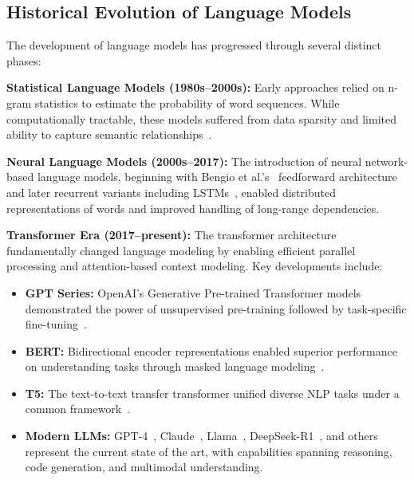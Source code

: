 \subsection{Historical Evolution of Language Models}

The development of language models has progressed through several distinct phases:

\textbf{Statistical Language Models (1980s--2000s):} Early approaches relied on n-gram statistics to estimate the probability of word sequences. While computationally tractable, these models suffered from data sparsity and limited ability to capture semantic relationships~\cite{manning1999foundations}.

\textbf{Neural Language Models (2000s--2017):} The introduction of neural network-based language models, beginning with Bengio et al.'s~\cite{bengio2003neural} feedforward architecture and later recurrent variants including LSTMs~\cite{hochreiter1997lstm}, enabled distributed representations of words and improved handling of long-range dependencies.

\textbf{Transformer Era (2017--present):} The transformer architecture~\cite{vaswani2017attention} fundamentally changed language modeling by enabling efficient parallel processing and attention-based context modeling. Key developments include:

\begin{itemize}[leftmargin=*]
    \item \textbf{GPT Series:} OpenAI's Generative Pre-trained Transformer models demonstrated the power of unsupervised pre-training followed by task-specific fine-tuning~\cite{radford2018gpt,radford2019gpt2,brown2020gpt3}.
    
    \item \textbf{BERT:} Bidirectional encoder representations enabled superior performance on understanding tasks through masked language modeling~\cite{devlin2019bert}.
    
    \item \textbf{T5:} The text-to-text transfer transformer unified diverse NLP tasks under a common framework~\cite{raffel2020t5}.
    
    \item \textbf{Modern LLMs:} GPT-4~\cite{achiam2023gpt4}, Claude~\cite{anthropic2024claude}, Llama~\cite{touvron2023llama,grattafiori2024llama3}, DeepSeek-R1~\cite{guo2025deepseek}, and others represent the current state of the art, with capabilities spanning reasoning, code generation, and multimodal understanding.
\end{itemize}

